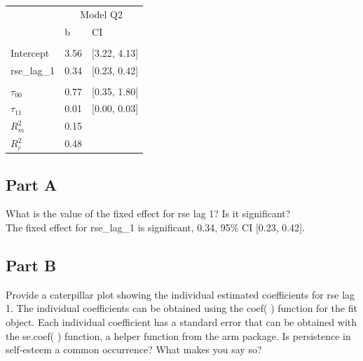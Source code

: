 \documentclass[]{article}
\begin{document}
\begin{table}[H]
\centering
\begin{tabular}{lll}
\toprule
\multicolumn{1}{c}{ } & \multicolumn{2}{c}{Model Q2} \\
\cmidrule(l{2pt}r{2pt}){2-3}
 & b & CI\\
\midrule
\addlinespace[0.3em]
\multicolumn{3}{l}{\textbf{Fixed}}\\
\hspace{1em}Intercept & 3.56 & [3.22, 4.13]\\
\hspace{1em}rse\_lag\_1 & 0.34 & [0.23, 0.42]\\
\addlinespace[0.3em]
\multicolumn{3}{l}{\textbf{Random}}\\
\hspace{1em}$\tau_{00}$ & 0.77 & [0.35, 1.80]\\
\hspace{1em}$\tau_{11}$ & 0.01 & [0.00, 0.03]\\
$R^2_m$ & 0.15 & \\
$R^2_c$ & 0.48 & \\
\bottomrule
\end{tabular}
\end{table}

\subsection{Part A}\label{part-a}

What is the value of the fixed effect for rse lag 1? Is it
significant?\\
The fixed effect for rse\_lag\_1 is significant, 0.34, 95\% CI {[}0.23,
0.42{]}.

\subsection{Part B}\label{part-b}

Provide a caterpillar plot showing the individual estimated coefficients
for rse lag 1. The individual coefficients can be obtained using the
coef( ) function for the fit object. Each individual coefficient has a
standard error that can be obtained with the se.coef( ) function, a
helper function from the arm package. Is persistence in self-esteem a
common occurrence? What makes you say so?
\end{document}
